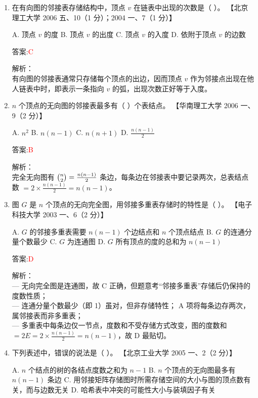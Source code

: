 \documentclass[lang=cn,newtx,10pt,scheme=chinese]{../../../elegantbook}
\begin{document}
\begin{enumerate}
\item 在有向图的邻接表存储结构中，顶点 $v$ 在链表中出现的次数是（ ）。  
    【北京理工大学 2006 五、10（1 分）；2004 一、7（1 分）】

    A. 顶点 $v$ 的度  
    B. 顶点 $v$ 的出度  
    C. 顶点 $v$ 的入度  
    D. 依附于顶点 $v$ 的边数

    答案:\textcolor{red}{C}

    解析：\\
    有向图的邻接表通常只存储每个顶点的出边，因而顶点 $v$ 作为邻接点出现在他人链表中时，即表示一条指向 $v$ 的弧，出现次数正好等于入度。\\

\item $n$ 个顶点的无向图的邻接表最多有（ ）个表结点。  
    【华南理工大学 2006 一、9（2 分）】

    A. $n^2$  
    B. $n(n-1)$  
    C. $n(n+1)$  
    D. $\tfrac{n(n-1)}{2}$

    答案:\textcolor{red}{B}

    解析：\\
    完全无向图有 $\tbinom{n}{2}=\tfrac{n(n-1)}{2}$ 条边，每条边在邻接表中要记录两次，总表结点数 $=2\times\tfrac{n(n-1)}{2}=n(n-1)$。\\

\item 图 $G$ 是 $n$ 个顶点的无向完全图，用邻接多重表存储时的特性是（ ）。  
    【电子科技大学 2003 一、6（2 分）】

    A. $G$ 的邻接多重表需要 $n(n-1)$ 个边结点和 $n$ 个顶点结点  
    B. $G$ 的连通分量个数最少  
    C. $G$ 为连通图  
    D. $G$ 所有顶点的度的总和为 $n(n-1)$

    答案:\textcolor{red}{D}

    解析：\\
    — 无向完全图是连通图，故 C 正确，但题意考“邻接多重表”存储后仍保持的度数性质；\\
    — 连通分量个数最少（即 1）虽对，但非存储特性； A 项将每条边存两次，属邻接表而非多重表；\\
    — 多重表中每条边仅一节点，度数和不受存储方式改变，图的度数和 $=2E=2\times\tfrac{n(n-1)}{2}=n(n-1)$，故 D 最贴切。\\

\item 下列表述中，错误的说法是（ ）。  
    【北京工业大学 2005 一、2（2 分）】

    A. $n$ 个结点的树的各结点度数之和为 $n-1$  
    B. $n$ 个顶点的无向图最多有 $n(n-1)$ 条边  
    C. 用邻接矩阵存储图时所需存储空间的大小与图的顶点数有关，而与边数无关  
    D. 哈希表中冲突的可能性大小与装填因子有关


\end{enumerate}
\end{document}

